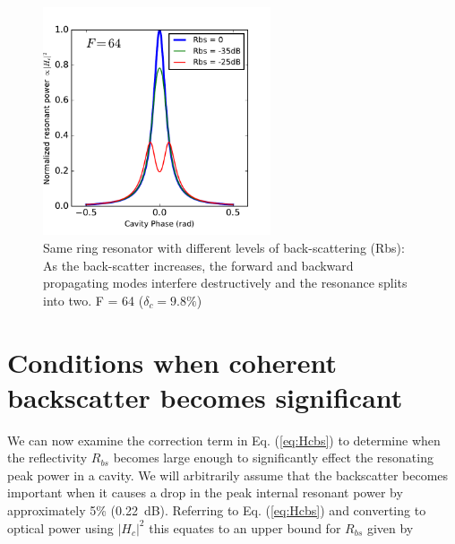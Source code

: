 \documentclass[10pt]{article}
\begin{document}





\begin{figure}[htbp]
\centering\includegraphics[width=0.6\textwidth]{figures/bs_split.pdf}
\caption{
Same ring resonator with different levels of back-scattering (Rbs):
As the back-scatter increases, the forward and backward propagating modes interfere destructively and the resonance splits into two.
F = 64 ($\delta_c = 9.8\%$)
} 
\label{fig:bs_split}
\end{figure}


\section{Conditions when coherent backscatter becomes significant}

We can now examine the correction term in Eq. (\ref{eq:Hcbs}) to determine when the reflectivity $R_{bs}$ becomes large enough to significantly effect the resonating peak power in a cavity.   We will arbitrarily assume that the backscatter becomes important when it causes a drop in the peak internal resonant power by approximately 5\% (0.22~dB).  Referring to Eq. (\ref{eq:Hcbs}) and  converting to optical power using $|H_c|^2$ this equates to an upper bound for $R_{bs}$ given by
\end{document}
